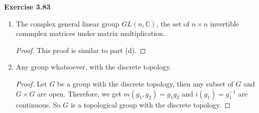 \documentclass[12pt, a4paper]{article}
\theoremstyle{plain}
\newcommand{\C}{\mathbb{C}}
\newenvironment{exercise}[2][Exercise]
    { \begin{mdframed}[backgroundcolor=gray!20] \textbf{#1 #2} \\}
    {  \end{mdframed}}
\begin{document}
\begin{exercise}{3.83}
\begin{enumerate}[label=(\alph*)]
\item The complex general linear group $GL(n,\C)$, the set of $n\times n$ invertible commplex matrices under matrix multiplication.
	\begin{proof}
	This proof is similar to part (d).
	\end{proof}

\item Any group whatsoever, with the discrete topology.
	\begin{proof}
	Let $G$ be a group with the discrete topology, then any subset of $G$ and $G\times G$ are open. Therefore, we get $m(g_1,g_2)=g_1g_2$ and $i(g_1)=g_1^{-1}$ are continuous. So $G$ is a topological group with the discrete topology.
	\end{proof}
\end{enumerate}
\end{exercise}
\end{document}
